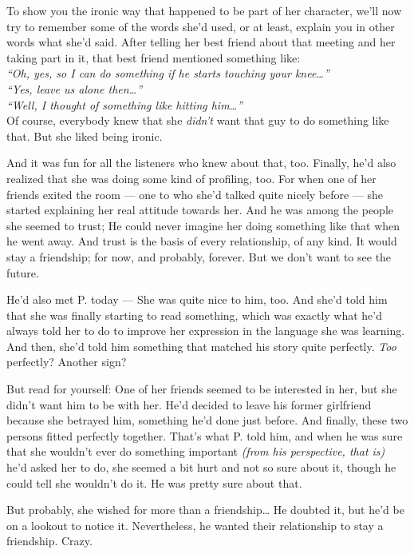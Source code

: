 To show you the ironic way that happened to be part of her character, we'll now try to remember some of the words she'd used, or at least, explain you in other words what she'd said. 
After telling her best friend about that meeting and her taking part in it, that best friend mentioned something like:\\
\emph{\enquote{Oh, yes, so I can do something if he starts touching your knee\dots{}}}\\
\emph{\enquote{Yes, leave us alone then\dots{}}}\\
\emph{\enquote{Well, I thought of something like hitting him\dots{}}}\\
Of course, everybody knew that she \emph{didn't} want that guy to do something like that. 
But she liked being ironic.

And it was fun for all the listeners who knew about that, too. 
Finally, he'd also realized that she was doing some kind of profiling, too. 
For when one of her friends exited the room --- one to who she'd talked quite nicely before --- she started explaining her real attitude towards her. 
And he was among the people she seemed to trust; He could never imagine her doing something like that when he went away. 
And trust is the basis of every relationship, of any kind. 
It would stay a friendship; for now, and probably, forever.
But we don't want to see the future.

He'd also met P. today --- She was quite nice to him, too. 
And she'd told him that she was finally starting to read something, which was exactly what he'd always told her to do to improve her expression in the language she was learning. 
And then, she'd told him something that matched his story quite perfectly. 
\emph{Too} perfectly?
Another sign?

But read for yourself:
One of her friends seemed to be interested in her, but she didn't want him to be with her. 
He'd decided to leave his former girlfriend because she betrayed him, something he'd done just before. 
And finally, these two persons fitted perfectly together. 
That's what P. told him, and when he was sure that she wouldn't ever do something important \emph{(from his perspective, that is)} he'd asked her to do, she seemed a bit hurt and not so sure about it, though he could tell she wouldn't do it.
He was pretty sure about that.

But probably, she wished for more than a friendship\dots{}
He doubted it, but he'd be on a lookout to notice it. 
Nevertheless, he wanted their relationship to stay a friendship. 
Crazy.

